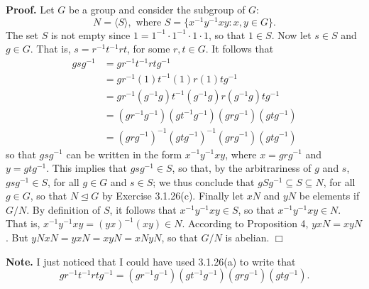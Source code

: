 \documentclass[9pt]{article}
\newcommand{\qed}{\hfill \ensuremath{\Box}}
\newcommand{\cyc}[1]{\langle #1 \rangle}
\begin{document}
\begin{enumerate}
      \textbf{Proof.} Let $G$ be a group and consider the subgroup of $G$:
      $$N = \cyc{S}, \text{ where } S = \{x^{-1}y^{-1}xy : x, y \in G\}.$$
      The set $S$ is not empty since $1 = 1^{-1}\cdot1^{-1}\cdot1\cdot1$, so
      that $1 \in S$. Now let $s \in S$ and $g \in G$. That is,
      $s = r^{-1}t^{-1}rt$, for some $r, t \in G$. It follows that
      \begin{align*}
         gsg^{-1} &= gr^{-1}t^{-1}rtg^{-1} \\
            &= gr^{-1}(1)t^{-1}(1)r(1)tg^{-1} \\
            &= gr^{-1}(g^{-1}g)t^{-1}(g^{-1}g)r(g^{-1}g)tg^{-1} \\
            &= (gr^{-1}g^{-1})(gt^{-1}g^{-1})(grg^{-1})(gtg^{-1}) \\
            &= (grg^{-1})^{-1}(gtg^{-1})^{-1}(grg^{-1})(gtg^{-1})
      \end{align*}
      so that $gsg^{-1}$ can be written in the form $x^{-1}y^{-1}xy$, where
      $x = grg^{-1}$ and $y = gtg^{-1}$. This implies that $gsg^{-1} \in S$, so
      that, by the arbitrariness of $g$ and $s$, $gsg^{-1} \in S$, for all
      $g \in G$ and $s \in S$; we thus conclude that
      $gSg^{-1} \subseteq S \subseteq N$, for all $g \in G$, so that $N 
      \trianglelefteq G$ by Exercise 3.1.26(c). Finally let $xN$ and $yN$ be
      elements if $G/N$. By definition of $S$, it follows that
      $x^{-1}y^{-1}xy \in S$, so that $x^{-1}y^{-1}xy \in N$. That is,
      $x^{-1}y^{-1}xy = (yx)^{-1}(xy) \in N$. According to Proposition 4,
      $yxN = xyN$. But $yNxN = yxN = xyN = xNyN$, so that $G/N$ is abelian.
      \qed
      
      \textbf{Note.} I just noticed that I could have used 3.1.26(a) to write
      that
      $$gr^{-1}t^{-1}rtg^{-1} = (gr^{-1}g^{-1})(gt^{-1}g^{-1})(grg^{-1})(gtg^{-1}).$$
\end{enumerate}
\end{document}
